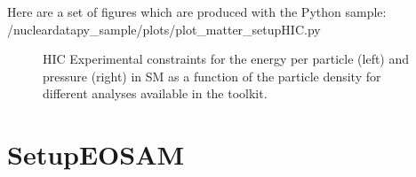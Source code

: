 \documentclass[letterpaper,10pt,english]{sphinxmanual}
\begin{document}
\sphinxAtStartPar
Here are a set of figures which are produced with the Python sample: /nucleardatapy\_sample/plots/plot\_matter\_setupHIC.py

\begin{figure}[htbp]
\centering
\capstart

\noindent{}
\caption{HIC Experimental constraints for the energy per particle (left) and pressure (right) in SM as a function of the particle density for different analyses available in the  toolkit.}\label{\detokenize{source/api/setup_matter_hic:id1}}\end{figure}

\sphinxstepscope


\section{SetupEOSAM}
\label{\detokenize{source/api/setup_eos_am:setupeosam}}\label{\detokenize{source/api/setup_eos_am::doc}}\label{\detokenize{source/api/setup_eos_am:module-nucleardatapy.eos.setup_am}}
\end{document}
